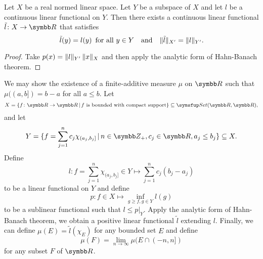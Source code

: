 \begin{corollary}
  Let $X$ be a real normed linear space. Let $Y$ be a subspace of $X$ and let $l$ be a continuous linear functional on $Y$. Then there exists a continuous linear functional $\tilde l\colon X\to\RR$ that satisfies
  \begin{equation*}
    \tilde l(y)=l(y)\text{\enskip for all }y\in Y\text{\quad and\quad} \Vert\tilde l\Vert_{X'}=\Vert l\Vert_{Y'}.
  \end{equation*}
\end{corollary}

\begin{proof}
  Take $p(x)=\Vert l\Vert_{Y'}\,\Vert x\Vert_X$ and then apply the analytic form of Hahn-Banach theorem.
\end{proof}

\begin{example}
  We may show the existence of a finite-additive measure $\mu$ on $\RR$ such that $\mu((a, b])=b-a$ for all $a\leq b$. Let
  \begin{equation*}
    X = \{f\colon\RR\to\RR\VERT f\text{ is bounded with compact support}\}\subseteq\CAT{Set}(\RR, \RR),
  \end{equation*}
  and let
  \begin{equation*}
    Y = \{f=\sum_{j=1}^nc_j\chi_{(a_j, b_j]}\VERT n\in\ZZ_+, c_j\in\RR, a_j\leq b_j\}\subseteq X.
  \end{equation*}
  Define
  \begin{equation*}
    l\colon f=\sum_{j=1}^n\chi_{(a_j, b_j]}\in Y\mapsto \sum_{j=1}^n c_j(b_j-a_j)
  \end{equation*}
  to be a linear functional on $Y$ and define
  \begin{equation*}
    p\colon f\in X\mapsto \inf_{g\geq f, g\in Y}l(g)
  \end{equation*}
  to be a sublinear functional such that $l\leq p\vert_Y$. Apply the analytic form of Hahn-Banach theorem, we obtain a positive linear functional $\tilde l$ extending $l$. Finally, we can define $\mu(E)=\tilde l(\chi_E)$ for any bounded set $E$ and define
  \begin{equation*}
    \mu(F)=\lim_{n\to\infty}\mu(E\cap (-n, n])
  \end{equation*}
  for any subset $F$ of $\RR$.
\end{example}

